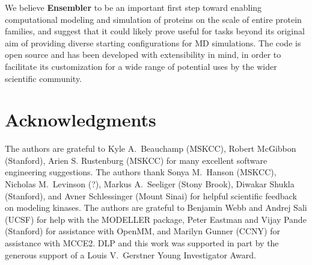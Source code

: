 \documentclass[aps,pre,twocolumn,nofootinbib,superscriptaddress,linenumbers]{revtex4-1}
\begin{document}
We believe {\bf Ensembler} to be an important first step toward enabling computational modeling and simulation of proteins on the scale of entire protein families, and suggest that it could likely prove useful for tasks beyond its original aim of providing diverse starting configurations for MD simulations.
The code is open source and has been developed with extensibility in mind, in order to facilitate its customization for a wide range of potential uses by the wider scientific community.





\section{Acknowledgments}
\label{section:acknowledgments}

The authors are grateful to Kyle A.~Beauchamp (MSKCC), Robert McGibbon (Stanford), Arien S. Rustenburg (MSKCC) for many excellent software engineering suggestions.
The authors thank Sonya M.~Hanson (MSKCC), Nicholas M.~Levinson (?), Markus A.~Seeliger (Stony Brook), Diwakar Shukla (Stanford), and Avner Schlessinger (Mount Sinai) for helpful scientific feedback on modeling kinases.
The authors are grateful to Benjamin Webb and Andrej Sali (UCSF) for help with the MODELLER package, Peter Eastman and Vijay Pande (Stanford) for assistance with OpenMM, and Marilyn Gunner (CCNY) for assistance with MCCE2.
DLP and this work was supported in part by the generous support of a Louis V.~Gerstner Young Investigator Award.


% 


\end{document}
